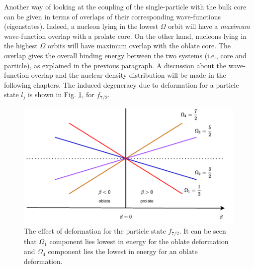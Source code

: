 Another way of looking at the coupling of the single-particle with the bulk core can be given in terms of overlaps of their corresponding wave-functions (eigenstates). Indeed, a nucleon lying in the lowest $\Omega$ orbit will have a \emph{maximum} wave-function overlap with a prolate core. On the other hand, nucleons lying in the highest $\Omega$ orbits will have maximum overlap with the oblate core. The overlap gives the overall binding energy between the two systems (i.e., core and particle), as explained in the previous paragraph. A discussion about the wave-function overlap and the nuclear density distribution \cite{frauendorf2014transverse, das2018nuclear} will be made in the following chapters. The induced degeneracy due to deformation for a particle state $l_j$ is shown in Fig. \ref{nillson-orbits-splittings}, for $f_{7/2}$.
\begin{figure}
    \centering
    \includegraphics[width=0.99\textwidth]{Chapters/Figures/nillson_SP_splittings.pdf}
    \caption{The effect of deformation for the particle state $f_{7/2}$. It can be seen that $\Omega_1$ component lies lowest in energy for the oblate deformation and $\Omega_4$ component lies the lowest in energy for an oblate deformation.}
    \label{nillson-orbits-splittings}
\end{figure}

